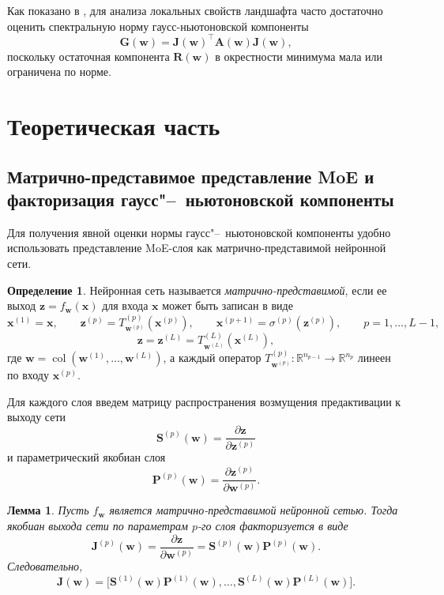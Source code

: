 \documentclass[11pt]{extarticle}
\DeclareMathOperator{\col}{col}
\newtheorem{lemma}{Лемма}
\theoremstyle{definition}
\newtheorem{definition}{Определение}
\theoremstyle{plain}
\theoremstyle{remark}
\begin{document}
Как показано в \cite{Kiselev2024, Meshkov2024}, для анализа локальных свойств ландшафта часто достаточно оценить спектральную норму гаусс-ньютоновской компоненты
\[
\mathbf{G}(\mathbf{w}) = \mathbf{J}(\mathbf{w})^\top \mathbf{A}(\mathbf{w}) \mathbf{J}(\mathbf{w}),
\]
поскольку остаточная компонента \(\mathbf{R}(\mathbf{w})\) в окрестности минимума мала или ограничена по норме.

\section{Теоретическая часть}

\subsection{Матрично-представимое представление MoE и факторизация гаусс"--~ньютоновской компоненты}

Для получения явной оценки нормы гаусс"--~ньютоновской компоненты удобно использовать представление MoE-слоя как матрично-представимой нейронной сети.

\begin{definition}
Нейронная сеть называется \emph{матрично-представимой}, если ее выход $\mathbf z=f_{\mathbf w}(\mathbf x)$ для входа $\mathbf x$ может быть записан в виде
$$
\mathbf x^{(1)}=\mathbf x,\qquad
\mathbf z^{(p)}=T^{(p)}_{\mathbf w^{(p)}}(\mathbf x^{(p)}),\qquad
\mathbf x^{(p+1)}=\sigma^{(p)}(\mathbf z^{(p)}),\qquad p=1,\dots,L-1,
$$
$$
\mathbf z=\mathbf z^{(L)}=T^{(L)}_{\mathbf w^{(L)}}(\mathbf x^{(L)}),
$$
где $\mathbf w=\col(\mathbf w^{(1)},\dots,\mathbf w^{(L)})$, а каждый оператор
$
T^{(p)}_{\mathbf w^{(p)}}:\mathbb R^{n_{p-1}}\to\mathbb R^{n_p}
$
линеен по входу $\mathbf x^{(p)}$.
\end{definition}

Для каждого слоя введем матрицу распространения возмущения предактивации к выходу сети
$$
\mathbf S^{(p)}(\mathbf w)=\frac{\partial \mathbf z}{\partial \mathbf z^{(p)}}
$$
и параметрический якобиан слоя
$$
\mathbf P^{(p)}(\mathbf w)=\frac{\partial \mathbf z^{(p)}}{\partial \mathbf w^{(p)}}.
$$

\begin{lemma}
\label{lem:jacobian-factorization}
Пусть $f_{\mathbf w}$ является матрично-представимой нейронной сетью. Тогда якобиан выхода сети по параметрам $p$-го слоя факторизуется в виде
$$
\mathbf J^{(p)}(\mathbf w)
=
\frac{\partial \mathbf z}{\partial \mathbf w^{(p)}}
=
\mathbf S^{(p)}(\mathbf w)\mathbf P^{(p)}(\mathbf w).
$$
Следовательно,
$$
\mathbf J(\mathbf w)
=
\bigl[
\mathbf S^{(1)}(\mathbf w)\mathbf P^{(1)}(\mathbf w),\dots,
\mathbf S^{(L)}(\mathbf w)\mathbf P^{(L)}(\mathbf w)
\bigr].
$$
\end{lemma}
\end{document}
